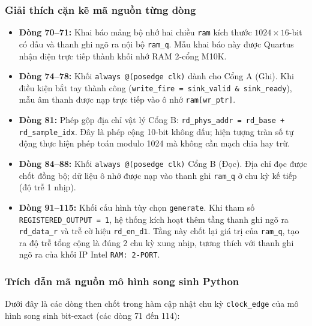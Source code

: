 

\subsubsection*{Giải thích cặn kẽ mã nguồn từng dòng}
\begin{itemize}[leftmargin=1.5em, itemsep=2pt]
    \item \textbf{Dòng 70--71:} Khai báo mảng bộ nhớ hai chiều \texttt{ram} kích thước $1024 \times 16$-bit có dấu và thanh ghi ngõ ra nội bộ \texttt{ram\_q}. Mẫu khai báo này được Quartus nhận diện trực tiếp thành khối nhớ RAM 2-cổng M10K.
    \item \textbf{Dòng 74--78:} Khối \texttt{always @(posedge clk)} dành cho Cổng A (Ghi). Khi điều kiện bắt tay thành công (\texttt{write\_fire = sink\_valid \& sink\_ready}), mẫu âm thanh được nạp trực tiếp vào ô nhớ \texttt{ram[wr\_ptr]}.
    \item \textbf{Dòng 81:} Phép gộp địa chỉ vật lý Cổng B: \texttt{rd\_phys\_addr = rd\_base + rd\_sample\_idx}. Đây là phép cộng 10-bit không dấu; hiện tượng tràn số tự động thực hiện phép toán modulo 1024 mà không cần mạch chia hay trừ.
    \item \textbf{Dòng 84--88:} Khối \texttt{always @(posedge clk)} Cổng B (Đọc). Địa chỉ đọc được chốt đồng bộ; dữ liệu ô nhớ được nạp vào thanh ghi \texttt{ram\_q} ở chu kỳ kế tiếp (độ trễ 1 nhịp).
    \item \textbf{Dòng 91--115:} Khối cấu hình tùy chọn \texttt{generate}. Khi tham số \texttt{REGISTERED\_OUTPUT = 1}, hệ thống kích hoạt thêm tầng thanh ghi ngõ ra \texttt{rd\_data\_r} và trễ cờ hiệu \texttt{rd\_en\_d1}. Tầng này chốt lại giá trị của \texttt{ram\_q}, tạo ra độ trễ tổng cộng là đúng 2 chu kỳ xung nhịp, tương thích với thanh ghi ngõ ra của khối IP Intel \texttt{RAM: 2-PORT}.
\end{itemize}

\subsubsection*{Trích dẫn mã nguồn mô hình song sinh Python}
Dưới đây là các dòng then chốt trong hàm cập nhật chu kỳ \texttt{clock\_edge} của mô hình song sinh bit-exact  (các dòng 71 đến 114):



